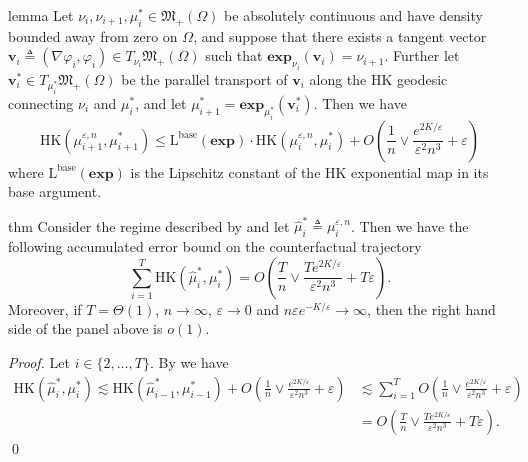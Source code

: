 \documentclass[11pt]{article}
\begin{document}
\begin{restatable}{lemma}{} \label{HK trajectory consistency}
    Let $\nu_{i}, \nu_{i+1}, \mu_i^* \in \mathfrak{M}_+(\Omega)$ be absolutely continuous and have density bounded away from zero on $\Omega$, and suppose that there exists a tangent vector $\mathbf{v}_i \triangleq (\nabla \varphi_i, \varphi_i) \in T_{\nu_i}\mathfrak{M}_+(\Omega)$ such that $\mathbf{exp}_{\nu_i}(\mathbf{v}_i) = \nu_{i+1}$. Further let $\mathbf{v}_i^* \in T_{\mu_i^*}\mathfrak{M}_+(\Omega)$ be the parallel transport of $\mathbf{v}_i$ along the HK geodesic connecting $\nu_i$ and $\mu_i^*$, and let $\mu_{i+1}^* = \mathbf{exp}_{\mu_i^*}(\mathbf{v}_i^*)$. Then we have
    \[\text{HK}(\mu_{i+ 1}^{\varepsilon, n}, \mu_{i + 1}^*) \leq \text{L}^{\text{base}}(\mathbf{exp})\cdot\text{HK}(\mu_{i}^{\varepsilon, n}, \mu_i^*) + O\left(\frac{1}{n} \vee\frac{e^{2K/\varepsilon}}{\varepsilon^2n^3} + \varepsilon\right)\]
    where $\text{L}^{\text{base}}(\mathbf{exp})$ is the Lipschitz constant of the HK exponential map in its base argument.
\end{restatable}

\begin{restatable}{thm}{}
    Consider the regime described by  and let $\hat\mu_{i}^* \triangleq \mu_{i}^{\varepsilon, n}$. Then we have the following accumulated error bound on the counterfactual trajectory
    \[\sum_{i = 1}^T\text{HK}(\hat{\mu}_i^*, \mu_i^*) = O\left(\frac{T}{n} \vee\frac{Te^{2K/\varepsilon}}{\varepsilon^2n^3} + T\varepsilon\right).\]
    Moreover, if $T = \Theta(1)$, $n \rightarrow \infty$, $\varepsilon \rightarrow 0$ and $n\varepsilon e^{-K/\varepsilon} \rightarrow \infty$, then the right hand side of the panel above is $o(1)$. 
\end{restatable}
\noindent \textit{Proof.} Let $i \in \{2, \dots, T\}$. By  we have
\begin{align*}
    \text{HK}(\hat{\mu}_i^*, \mu_i^*) \lesssim \text{HK}(\hat\mu_{i-1}^*, \mu_{i-1}^*) + O\left(\frac{1}{n} \vee\frac{e^{2K/\varepsilon}}{\varepsilon^2n^3} + \varepsilon\right) &\lesssim \sum_{i = 1}^TO\left(\frac{1}{n} \vee\frac{e^{2K/\varepsilon}}{\varepsilon^2n^3} + \varepsilon\right)\\ &= O\left(\frac{T}{n} \vee\frac{Te^{2K/\varepsilon}}{\varepsilon^2n^3} + T\varepsilon\right).
\end{align*} \qed{}

\appendix
\end{document}
